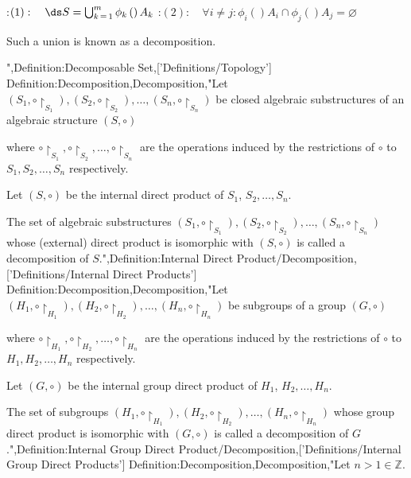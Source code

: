 :$(1):\quad \ds S = \bigcup_{k \mathop = 1}^m \phi_k \left(   \right){A_k}$ 
:$(2):\quad \forall i \ne j: \phi_i \left(   \right){A_i} \cap \phi_j \left(   \right){A_j} = \varnothing$

Such a union is known as a decomposition.

",Definition:Decomposable Set,['Definitions/Topology']
Definition:Decomposition,Decomposition,"Let $\left( S_1, \circ {\restriction_{S_1} }  \right), \left( S_2, \circ {\restriction_{S_2} }  \right), \ldots, \left( S_n, \circ {\restriction_{S_n} }  \right)$ be closed algebraic substructures of an algebraic structure $\left( S, \circ \right)$

where $\circ {\restriction_{S_1} }, \circ {\restriction_{S_2} }, \ldots, \circ {\restriction_{S_n} }$ are the operations induced by the restrictions of $\circ$ to $S_1, S_2, \ldots, S_n$ respectively.

Let $\left( S, \circ \right)$ be the internal direct product of $S_1$, $S_2, \ldots, S_n$.


The set of algebraic substructures $\left( S_1, \circ {\restriction_{S_1} }  \right), \left( S_2, \circ {\restriction_{S_2} }  \right), \ldots, \left( S_n, \circ {\restriction_{S_n} }  \right)$ whose (external) direct product is isomorphic with $\left( S, \circ \right)$ is called a decomposition of $S$.",Definition:Internal Direct Product/Decomposition,['Definitions/Internal Direct Products']
Definition:Decomposition,Decomposition,"Let $\left( H_1, \circ {\restriction_{H_1} }  \right), \left( H_2, \circ {\restriction_{H_2} }  \right), \ldots, \left( H_n, \circ {\restriction_{H_n} }  \right)$ be subgroups of a group $\left( G, \circ \right)$

where $\circ {\restriction_{H_1} }, \circ {\restriction_{H_2} }, \ldots, \circ {\restriction_{H_n} }$ are the operations induced by the restrictions of $\circ$ to $H_1, H_2, \ldots, H_n$ respectively.

Let $\left( G, \circ \right)$ be the internal group direct product of $H_1$, $H_2, \ldots, H_n$.


The set of subgroups $\left( H_1, \circ {\restriction_{H_1} }  \right), \left( H_2, \circ {\restriction_{H_2} }  \right), \ldots, \left( H_n, \circ {\restriction_{H_n} }  \right)$ whose group direct product is isomorphic with $\left( G, \circ \right)$ is called a decomposition of $G$.",Definition:Internal Group Direct Product/Decomposition,['Definitions/Internal Group Direct Products']
Definition:Decomposition,Decomposition,"Let $n > 1 \in \mathbb Z$.


